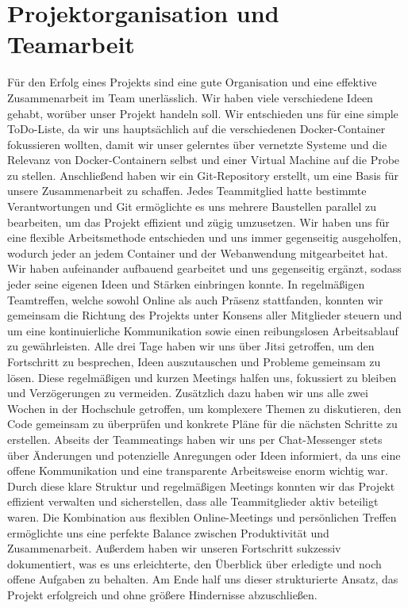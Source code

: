 \section{Projektorganisation und Teamarbeit }\label{einleitung}
Für den Erfolg eines Projekts sind eine gute Organisation und eine effektive Zusammenarbeit im Team unerlässlich. Wir haben viele verschiedene Ideen gehabt, worüber unser Projekt handeln soll. Wir entschieden uns für eine simple ToDo-Liste, da wir uns hauptsächlich auf die verschiedenen Docker-Container fokussieren wollten, damit wir unser gelerntes über vernetzte Systeme und die Relevanz von Docker-Containern selbst und einer Virtual Machine auf die Probe zu stellen. Anschließend haben wir ein Git-Repository erstellt, um eine Basis für unsere Zusammenarbeit zu schaffen. Jedes Teammitglied hatte bestimmte Verantwortungen und Git ermöglichte es uns mehrere Baustellen parallel zu bearbeiten, um das Projekt effizient und zügig umzusetzen. Wir haben uns für eine flexible Arbeitsmethode entschieden und uns immer gegenseitig ausgeholfen, wodurch jeder an jedem Container und der Webanwendung mitgearbeitet hat. Wir haben aufeinander aufbauend gearbeitet und uns gegenseitig ergänzt, sodass jeder seine eigenen Ideen und Stärken einbringen konnte. In regelmäßigen Teamtreffen, welche sowohl Online als auch Präsenz stattfanden, konnten wir gemeinsam die Richtung des Projekts unter Konsens aller Mitglieder steuern und um eine kontinuierliche Kommunikation sowie einen reibungslosen Arbeitsablauf zu gewährleisten. Alle drei Tage haben wir uns über Jitsi getroffen, um den Fortschritt zu besprechen, Ideen auszutauschen und Probleme gemeinsam zu lösen. Diese regelmäßigen und kurzen Meetings halfen uns, fokussiert zu bleiben und Verzögerungen zu vermeiden. Zusätzlich dazu haben wir uns alle zwei Wochen in der Hochschule getroffen, um komplexere Themen zu diskutieren, den Code gemeinsam zu überprüfen und konkrete Pläne für die nächsten Schritte zu erstellen. Abseits der Teammeatings haben wir uns per Chat-Messenger stets über Änderungen und potenzielle Anregungen oder Ideen informiert, da uns eine offene Kommunikation und eine transparente Arbeitsweise enorm wichtig war. Durch diese klare Struktur und regelmäßigen Meetings konnten wir das Projekt effizient verwalten und sicherstellen, dass alle Teammitglieder aktiv beteiligt waren. Die Kombination aus flexiblen Online-Meetings und persönlichen Treffen ermöglichte uns eine perfekte Balance zwischen Produktivität und Zusammenarbeit. Außerdem haben wir unseren Fortschritt sukzessiv dokumentiert, was es uns erleichterte, den Überblick über erledigte und noch offene Aufgaben zu behalten. Am Ende half uns dieser strukturierte Ansatz, das Projekt erfolgreich und ohne größere Hindernisse abzuschließen.

